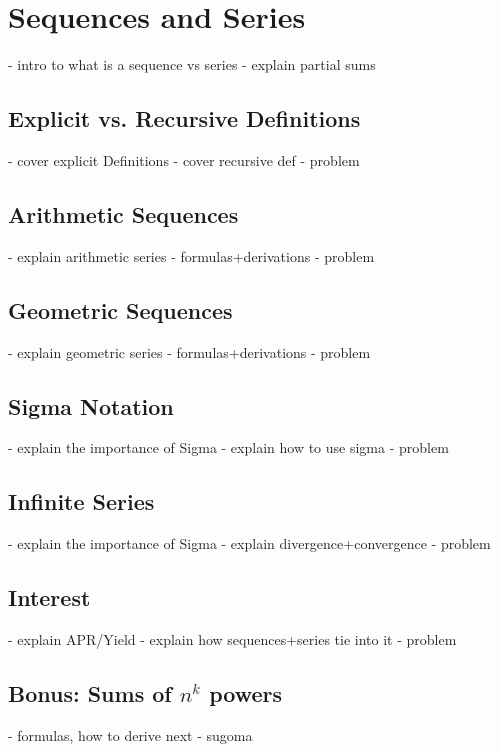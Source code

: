 \chapter{Sequences and Series}
- intro to what is a sequence vs series
- explain partial sums
\section{Explicit vs. Recursive Definitions}
- cover explicit Definitions
- cover recursive def 
- problem
\section{Arithmetic Sequences}
- explain arithmetic series
- formulas+derivations
- problem
\section{Geometric Sequences}
- explain geometric series
- formulas+derivations
- problem
\section{Sigma Notation}
- explain the importance of Sigma
- explain how to use sigma
- problem
\section{Infinite Series}
- explain the importance of Sigma
- explain divergence+convergence
- problem
\section{Interest}
- explain APR/Yield
- explain how sequences+series tie into it
- problem

\begin{subappendices}
\section{Bonus: Sums of $n^k$ powers}
    - formulas, how to derive next
    - sugoma
\end{subappendices}